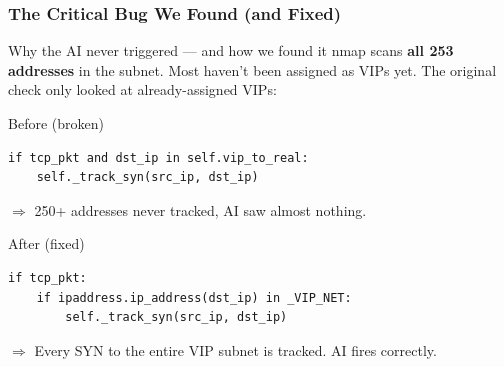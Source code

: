 \documentclass{beamer}
\begin{document}
\begin{frame}[fragile]
\frametitle{The Critical Bug We Found (and Fixed)}

\begin{alertblock}{Why the AI never triggered --- and how we found it}
nmap scans \textbf{all 253 addresses} in the subnet.
Most haven't been assigned as VIPs yet.
The original check only looked at already-assigned VIPs:
\end{alertblock}

\begin{block}{Before (broken)}
\begin{verbatim}
if tcp_pkt and dst_ip in self.vip_to_real:
    self._track_syn(src_ip, dst_ip)
\end{verbatim}
$\Rightarrow$ 250+ addresses never tracked, AI saw almost nothing.
\end{block}

\begin{exampleblock}{After (fixed)}
\begin{verbatim}
if tcp_pkt:
    if ipaddress.ip_address(dst_ip) in _VIP_NET:
        self._track_syn(src_ip, dst_ip)
\end{verbatim}
$\Rightarrow$ Every SYN to the entire VIP subnet is tracked. AI fires correctly.
\end{exampleblock}

\end{frame}
\end{document}
